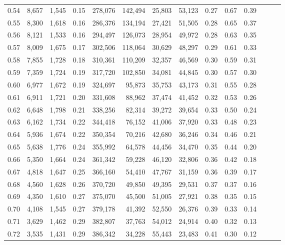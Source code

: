 \begin{tabular}{rrrrrrrrrrrrrr}
0.54 &  8,657 &  1,545 &  0.15 &  278,076 &  142,494 &  25,803 &  53,123 &  0.27 &  0.67 &      0.39 \\
0.55 &  8,300 &  1,618 &  0.16 &  286,376 &  134,194 &  27,421 &  51,505 &  0.28 &  0.65 &      0.37 \\
0.56 &  8,121 &  1,533 &  0.16 &  294,497 &  126,073 &  28,954 &  49,972 &  0.28 &  0.63 &      0.35 \\
0.57 &  8,009 &  1,675 &  0.17 &  302,506 &  118,064 &  30,629 &  48,297 &  0.29 &  0.61 &      0.33 \\
0.58 &  7,855 &  1,728 &  0.18 &  310,361 &  110,209 &  32,357 &  46,569 &  0.30 &  0.59 &      0.31 \\
0.59 &  7,359 &  1,724 &  0.19 &  317,720 &  102,850 &  34,081 &  44,845 &  0.30 &  0.57 &      0.30 \\
0.60 &  6,977 &  1,672 &  0.19 &  324,697 &   95,873 &  35,753 &  43,173 &  0.31 &  0.55 &      0.28 \\
0.61 &  6,911 &  1,721 &  0.20 &  331,608 &   88,962 &  37,474 &  41,452 &  0.32 &  0.53 &      0.26 \\
0.62 &  6,648 &  1,798 &  0.21 &  338,256 &   82,314 &  39,272 &  39,654 &  0.33 &  0.50 &      0.24 \\
0.63 &  6,162 &  1,734 &  0.22 &  344,418 &   76,152 &  41,006 &  37,920 &  0.33 &  0.48 &      0.23 \\
0.64 &  5,936 &  1,674 &  0.22 &  350,354 &   70,216 &  42,680 &  36,246 &  0.34 &  0.46 &      0.21 \\
0.65 &  5,638 &  1,776 &  0.24 &  355,992 &   64,578 &  44,456 &  34,470 &  0.35 &  0.44 &      0.20 \\
0.66 &  5,350 &  1,664 &  0.24 &  361,342 &   59,228 &  46,120 &  32,806 &  0.36 &  0.42 &      0.18 \\
0.67 &  4,818 &  1,647 &  0.25 &  366,160 &   54,410 &  47,767 &  31,159 &  0.36 &  0.39 &      0.17 \\
0.68 &  4,560 &  1,628 &  0.26 &  370,720 &   49,850 &  49,395 &  29,531 &  0.37 &  0.37 &      0.16 \\
0.69 &  4,350 &  1,610 &  0.27 &  375,070 &   45,500 &  51,005 &  27,921 &  0.38 &  0.35 &      0.15 \\
0.70 &  4,108 &  1,545 &  0.27 &  379,178 &   41,392 &  52,550 &  26,376 &  0.39 &  0.33 &      0.14 \\
0.71 &  3,629 &  1,462 &  0.29 &  382,807 &   37,763 &  54,012 &  24,914 &  0.40 &  0.32 &      0.13 \\
0.72 &  3,535 &  1,431 &  0.29 &  386,342 &   34,228 &  55,443 &  23,483 &  0.41 &  0.30 &      0.12 \\

\end{tabular}
